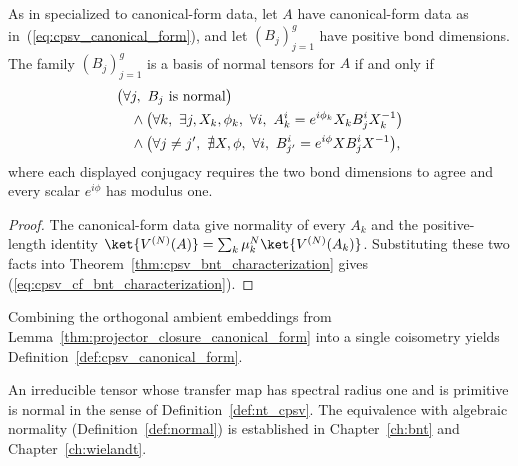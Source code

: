 \begin{lemma}
    \label{thm:cpsv_canonical_form_bnt_characterization}
    \leanok
    As in \cite[Proposition~2.7 and Appendix~A]{Cirac2016MPDO_arXiv}
    specialized to canonical-form data, let $A$ have canonical-form data as
    in~(\ref{eq:cpsv_canonical_form}), and let $(B_j)_{j=1}^{g}$ have positive
    bond dimensions. The family $(B_j)_{j=1}^{g}$ is a basis of normal tensors
    for $A$ if and only if
    \begin{align}
         & \bigl(\forall j,\ B_j\text{ is normal}\bigr)
        \notag                                          \\
         & \quad\land
        \bigl(\forall k,\ \exists j,X_k,\phi_k,\
        \forall i,\ A_k^i=e^{i\phi_k}X_kB_j^iX_k^{-1}\bigr)
        \notag                                          \\
         & \quad\land
        \bigl(\forall j\ne j',\ \nexists X,\phi,\ \forall i,\
        B_{j'}^i=e^{i\phi}XB_j^iX^{-1}\bigr),
        \label{eq:cpsv_cf_bnt_characterization}
    \end{align}
    where each displayed conjugacy requires the two bond dimensions to agree
    and every scalar $e^{i\phi}$ has modulus one.
\end{lemma}

\begin{proof}\leanok
    The canonical-form data give normality of every $A_k$ and the
    positive-length identity
    $\ket{V^{(N)}(A)}=\sum_k\mu_k^N\ket{V^{(N)}(A_k)}$.
    Substituting these two facts into
    Theorem~\ref{thm:cpsv_bnt_characterization} gives
    (\ref{eq:cpsv_cf_bnt_characterization}).
\end{proof}

Combining the orthogonal ambient embeddings from
Lemma~\ref{thm:projector_closure_canonical_form} into a single coisometry
yields Definition~\ref{def:cpsv_canonical_form}.

\begin{remark}
    An irreducible tensor whose transfer map has spectral radius one and is
    primitive is normal in the sense of Definition~\ref{def:nt_cpsv}. The
    equivalence with algebraic normality (Definition~\ref{def:normal}) is
    established in Chapter~\ref{ch:bnt} and Chapter~\ref{ch:wielandt}.
\end{remark}

